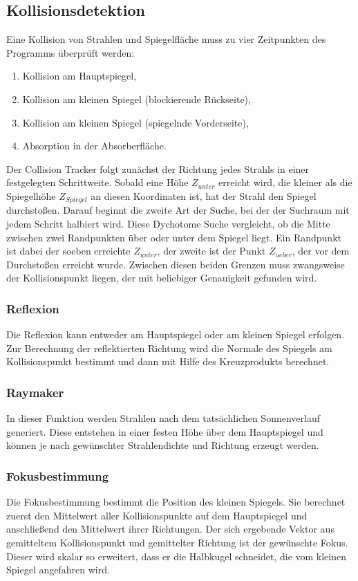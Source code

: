 \documentclass[fontsize=10pt,paper=a4,bibliography=totoc]{scrartcl}
\begin{document}
\subsection*{Kollisionsdetektion}
Eine Kollision von Strahlen und Spiegelfläche muss zu vier Zeitpunkten des Programms überprüft werden:
\begin{enumerate}
\item Kollision am Hauptspiegel,
\item Kollision am kleinen Spiegel (blockierende Rückseite),
\item Kollision am kleinen Spiegel (spiegelnde Vorderseite),
\item Absorption in der Absorberfläche.
\end{enumerate}
Der Collision Tracker folgt zunächst der Richtung jedes Strahls in einer festgelegten Schrittweite. Sobald eine Höhe $Z_{unter}$ erreicht wird, die kleiner als die Spiegelhöhe $Z_{Spiegel}$ an diesen Koordinaten ist, hat der Strahl den Spiegel durchstoßen.
Darauf beginnt die zweite Art der Suche, bei der der Suchraum mit jedem Schritt halbiert wird. Diese Dychotome Suche vergleicht, ob die Mitte zwischen zwei Randpunkten über oder unter dem Spiegel liegt. Ein Randpunkt ist dabei der soeben erreichte $Z_{unter}$, der zweite ist der Punkt $Z_{ueber}$, der vor dem Durchstoßen erreicht wurde. Zwischen diesen beiden Grenzen muss zwangsweise der Kollisionspunkt liegen, der mit beliebiger Genauigkeit gefunden wird. 

\subsubsection*{Reflexion}
Die Reflexion kann entweder am Hauptspiegel oder am kleinen Spiegel erfolgen. Zur Berechnung der reflektierten Richtung wird die Normale des Spiegels am Kollisionspunkt bestimmt und dann mit Hilfe des Kreuzprodukts berechnet.

\subsubsection*{Raymaker}
In dieser Funktion werden Strahlen nach dem tatsächlichen Sonnenverlauf generiert. Diese entstehen in einer festen Höhe über dem Hauptspiegel und können je nach gewünschter Strahlendichte und Richtung erzeugt werden.

\subsubsection*{Fokusbestimmung}
Die Fokusbestimmung bestimmt die Position des kleinen Spiegels. Sie berechnet zuerst den Mittelwert aller Kollisionspunkte auf dem Hauptspiegel und anschließend den Mittelwert ihrer Richtungen. Der sich ergebende Vektor aus gemitteltem Kollisionspunkt und gemittelter Richtung ist der gewünschte Fokus. Dieser wird skalar so erweitert, dass er die Halbkugel schneidet, die vom kleinen Spiegel angefahren wird.
\end{document}
